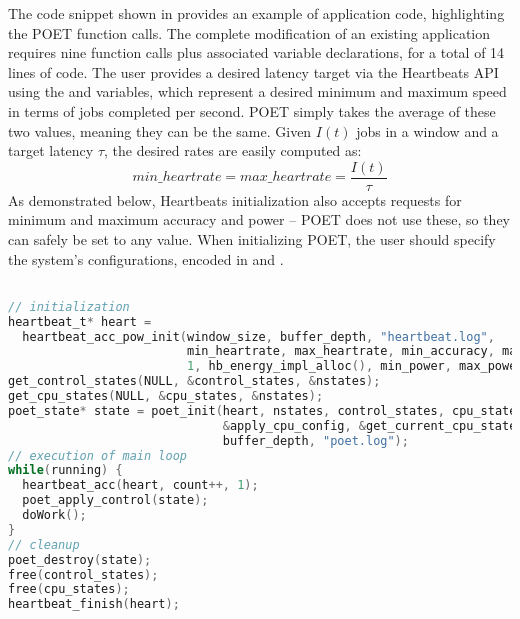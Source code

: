 The code snippet shown in  provides an example of application code, highlighting the POET function calls.
The complete modification of an existing application requires nine function calls plus associated variable declarations, for a total of 14 lines of code.
The user provides a desired latency target via the Heartbeats API using the  and  variables, which represent a desired minimum and maximum speed in terms of jobs completed per second.
POET simply takes the average of these two values, meaning they can be the same.
Given $I(t)$ jobs in a window and a target latency $\tau$, the desired rates are easily computed as:
\begin{equation}
  min\_heartrate = max\_heartrate = \frac{I(t)}{\tau} 
  \label{eqn:latency-to-performance}
\end{equation}
As demonstrated below, Heartbeats initialization also accepts requests for minimum and maximum accuracy and power -- POET does not use these, so they can safely be set to any value.
When initializing POET, the user should specify the system's configurations, encoded in  and .

%
\begin{lstlisting}[language=C,%
  caption={Example of POET application code.},%
  label={lst:poet-example}]%

// initialization
heartbeat_t* heart =
  heartbeat_acc_pow_init(window_size, buffer_depth, "heartbeat.log",
                         min_heartrate, max_heartrate, min_accuracy, max_accuracy,
                         1, hb_energy_impl_alloc(), min_power, max_power);
get_control_states(NULL, &control_states, &nstates);
get_cpu_states(NULL, &cpu_states, &nstates);
poet_state* state = poet_init(heart, nstates, control_states, cpu_states,
                              &apply_cpu_config, &get_current_cpu_state,
                              buffer_depth, "poet.log");
// execution of main loop
while(running) {
  heartbeat_acc(heart, count++, 1);
  poet_apply_control(state);
  doWork();
}
// cleanup
poet_destroy(state);
free(control_states);
free(cpu_states);
heartbeat_finish(heart);
\end{lstlisting}


